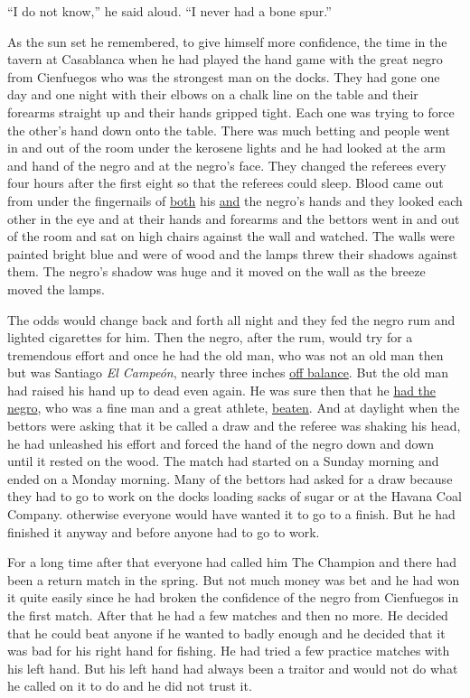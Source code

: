 \documentclass[fontset=ubuntu]{ctexrep}
\begin{document}
``I do not know,'' he said aloud. ``I never had a bone spur.''

As the sun set he remembered, to give himself more confidence, the time in
the \gls{tavern} at \gls{Casablanca} when he had played the hand game with
the great \gls{negro} from \gls{Cienfuegos} who was the strongest man on the
\glspl{dock}. They had gone one day and one night with their \glspl{elbow}
on a \gls{chalk} line on the table and their forearms straight up and their
hands gripped tight. Each one was trying to force the other's hand down onto
the table. There was much \gls{betting} and people went in and out of the
room under the \gls{kerosene} lights and he had looked at the arm and hand
of the negro and at the negro's face. They changed the \glspl{referee} every
four hours after the first eight so that the referees could sleep. Blood
came out from under the \glspl{fingernail} of \uline{both} his \uline{and}
the negro's hands and they looked each other in the eye and at their hands
and forearms and the \glspl{bettor} went in and out of the room and sat on
high chairs against the wall and watched. The walls were painted bright blue
and were of wood and the lamps \gls{threw} their shadows against them. The
negro's shadow was huge and it moved on the wall as the breeze moved the
lamps.

The \gls{odds} would change back and \gls{forth} all night and they fed the
negro \gls{rum} and lighted cigarettes for him. Then the negro, after the
rum, would try for a \gls{tremendous} effort and once he had the old man,
who was not an old man then but was Santiago \emph{El Campeón}, nearly
three inches \uline{off balance}. But the old man had raised his hand up to
dead even again. He was sure then that he \uline{had the negro}, who was a
fine man and a great \gls{athlete}, \uline{beaten}. And at daylight when the
bettors were asking that it be called a draw and the referee was shaking his
head, he had unleashed his effort and forced the hand of the negro down and
down until it rested on the wood. The match had started on a Sunday morning
and ended on a Monday morning. Many of the bettors had asked for a draw
because they had to go to work on the docks \gls{loading} sacks of sugar or
at the Havana Coal Company. \Gls{otherwise} everyone would have wanted it to
go to a finish. But he had finished it anyway and before anyone had to go to
work.

For a long time after that everyone had called him The Champion and there
had been a return match in the spring. But not much money was bet and he had
won it quite easily since he had broken the confidence of the negro from
Cienfuegos in the first match. After that he had a few matches and then no
more. He decided that he could beat anyone if he wanted to \gls{badly}
enough and he decided that it was bad for his right hand for fishing. He had
tried a few practice matches with his left hand. But his left hand had
always been a \gls{traitor} and would not do what he called on it to do and
he did not trust it.
\end{document}
